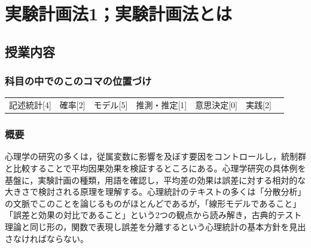 \section{実験計画法1；実験計画法とは}
\label{D1_lesson12}

\subsection{授業内容}
\subsubsection{科目の中でのこのコマの位置づけ}
\begin{tabular}[t]{ccccccc}
    記述統計[4] & 確率[2] & モデル[5] & 推測・推定[1] & 意思決定[0] & 実践[2]
\end{tabular}
\subsubsection{概要}
心理学の研究の多くは，従属変数に影響を及ぼす要因をコントロールし，統制群と比較することで平均因果効果を検証するところにある。心理学研究の具体例を基盤に，実験計画の種類，用語を確認し，平均差の効果は誤差に対する相対的な大きさで検討される原理を理解する。心理統計のテキストの多くは「分散分析」の文脈でこのことを論じるものがほとんどであるが，「線形モデルであること」「誤差と効果の対比であること」という2つの観点から読み解き，古典的テスト理論と同じ形の，関数で表現し誤差を分離するという心理統計の基本方針を見出さなければならない。
